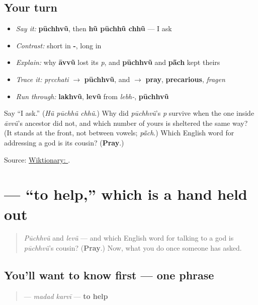 \subsection*{Your turn}
\begin{itemize}
\raggedright
  \item \emph{Say it:} \textbf{pūchhvũ}, then \textbf{hũ pūchhũ chhũ} — I ask
  \item \emph{Contrast:} short \textbf{} in \textbf{-}, long \textbf{} in \textbf{}
  \item \emph{Explain:} why \textbf{āvvũ} lost its \emph{p}, and \textbf{pūchhvũ} and \textbf{pā̃ch} kept theirs
  \item \emph{Trace it:} \emph{pṛcchati} $\to$ \textbf{pūchhvũ}, and $\to$ \textbf{pray}, \textbf{precarious}, \emph{fragen}
  \item \emph{Run through:} \textbf{lakhvũ}, \textbf{levũ} from \emph{lebh-}, \textbf{pūchhvũ}
\end{itemize}

\begin{tcolorbox}[breakable,colback=teal!4,colframe=teal!35!black,title={Before you move on}]
Say \textquotedblleft{}I ask.\textquotedblright{} (\emph{Hũ pūchhũ chhũ}.) Why did \emph{pūchhvũ}'s \emph{p} survive when the one inside \emph{āvvũ}'s ancestor did not, and which number of yours is sheltered the same way? (It stands at the front, not between vowels; \emph{pā̃ch}.) Which English word for addressing a god is its cousin? (\textbf{Pray}.)

Source: \href{https://en.wiktionary.org/wiki/\%E0\%AA\%AA\%E0\%AB\%82\%E0\%AA\%9B\%E0\%AA\%B5\%E0\%AB\%81\%E0\%AA\%82}{Wiktionary: }.
\end{tcolorbox}
\section[madad karvī]{  — \textquotedblleft{}to help,\textquotedblright{} which is a hand held out}

\label{lesson:GU-C09-madad-karvi}



\begin{quote}
\emph{Pūchhvũ} and \emph{levũ} — and which English word for talking to a god is \emph{pūchhvũ}'s cousin? (\textbf{Pray}.) Now, what you do once someone has asked.
\end{quote}

\subsection*{You'll want to know first — one phrase}
\begin{quote}
\textbf{ } — \emph{madad karvī} — \textbf{to help}
\end{quote}

